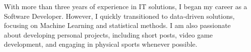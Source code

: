 

\begin{cvparagraph}



With more than three years of experience in IT solutions, I began my career as
a Software Developer. However, I quickly transitioned to data-driven solutions,
focusing on Machine Learning and statistical methods. I am also passionate
about developing personal projects, including short posts, video game
development, and engaging in physical sports whenever possible.



\end{cvparagraph}
